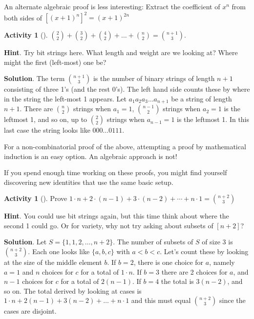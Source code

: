 \documentclass[10pt,]{book}
\theoremstyle{plain}
\theoremstyle{definition}
\theoremstyle{definition}
\theoremstyle{definition}
\newtheorem{activity}[project]{Activity}
\theoremstyle{definition}
\numberwithin{equation}{chapter}
\newcommand{\lt}{<}
\begin{document}
\hypertarget{p-617}{}%
An alternate algebraic proof is less interesting: Extract the coefficient of \(x^{n}\) from both sides of \(\left\lbrack \left( x + 1 \right)^{n} \right\rbrack^{2} = \left(x + 1 \right)^{2n}\)%
\begin{activity}[]\label{activity-45}
\hypertarget{p-618}{}%
\(\binom{2}{2} + \binom{3}{2} + \binom{4}{2} + \ldots + \binom{n}{2} = \binom{n + 1}{3}\).%
\par\smallskip%
\noindent\textbf{Hint}.\hypertarget{hint-33}{}\quad%
\hypertarget{p-619}{}%
Try bit strings here.  What length and weight are we looking at?  Where might the first (left-most) one be?%
\par\smallskip%
\noindent\textbf{Solution}.\hypertarget{solution-53}{}\quad%
\hypertarget{p-620}{}%
The term \(\binom{n + 1}{3}\) is the number of binary strings of length \(n + 1\) consisting of three 1's (and the rest 0's). The left hand side counts these by where in the string the left-most 1 appears. Let \(a_{1}a_{2}a_{3}\ldots a_{n + 1}\) be a string of length \(n + 1\). There are \(\binom{n}{2}\) strings when \(a_{1} = 1\), \(\binom{n - 1}{2}\) strings when \(a_{2} = 1\) is the leftmost 1, and so on, up to \(\binom{2}{2}\) strings when \(a_{n - 1} = 1\) is the leftmost 1. In this last case the string looks like \(000\ldots 0111\).%
\end{activity}
\hypertarget{p-621}{}%
For a non-combinatorial proof of the above, attempting a proof by mathematical induction is an easy option. An algebraic approach is not!%
\par
\hypertarget{p-622}{}%
If you spend enough time working on these proofs, you might find yourself discovering new identities that use the same basic setup.%
\begin{activity}[]\label{activity-46}
\hypertarget{p-623}{}%
Prove \(1\cdot n + 2 \cdot (n-1) + 3 \cdot (n-2) + \cdots + n \cdot 1 = \binom{n+2}{3}\)%
\par\smallskip%
\noindent\textbf{Hint}.\hypertarget{hint-34}{}\quad%
\hypertarget{p-624}{}%
You could use bit strings again, but this time think about where the second 1 could go.  Or for variety, why not try asking about subsets of \([n+2]\)?%
\par\smallskip%
\noindent\textbf{Solution}.\hypertarget{solution-54}{}\quad%
\hypertarget{p-625}{}%
\hypertarget{p-626}{}%
Let \(S = \{1,1,2,\ldots,n + 2\}\). The number of subsets of \(S\) of size 3 is \(\binom{n + 2}{3}\). Each one looks like \(\{a, b, c\}\) with \(a \lt b \lt c\). Let's count these by looking at the size of the middle element \(b\). If \(b=2\), there is one choice for \(a\), namely \(a=1\) and \(n\) choices for \(c\) for a total of \(1 \cdot n\). If \(b=3\) there are 2 choices for \(a\), and \(n - 1\) choices for \(c\) for a total of \(2(n - 1)\). If \(b=4\) the total is \(3(n - 2)\), and so on. The total derived by looking at cases is \(1 \cdot n + 2\left( n - 1 \right) + 3\left( n - 2 \right) + \ldots + n \cdot 1\) and this must equal \(\binom{n + 2}{3}\) since the cases are disjoint.%
%
\end{activity}
\end{document}

